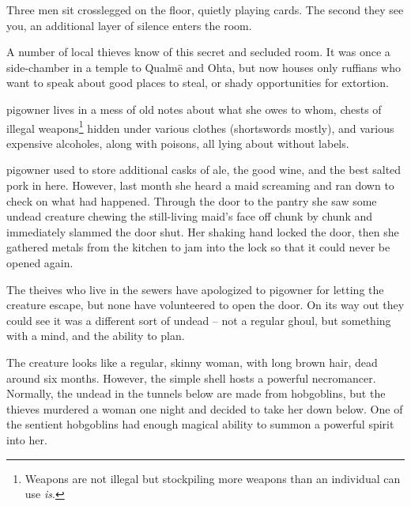 \begin{multicols}{2}

\begin{boxtext}
	Three men sit crosslegged on the floor, quietly playing cards.  The second they see you, an additional layer of silence enters the room.
\end{boxtext}

A number of local thieves know of this secret and secluded room.  It was once a side-chamber in a temple to Qualm\"{e} and Ohta, but now houses only ruffians who want to speak about good places to steal, or shady opportunities for extortion.


\humanthief


\Gls{pigowner} lives in a mess of old notes about what she owes to whom, chests of illegal weapons\footnote{Weapons are not illegal but stockpiling more weapons than an individual can use \emph{is}.} hidden under various clothes (shortswords mostly), and various expensive alcoholes, along with poisons, all lying about without labels.


\Gls{pigowner} used to store additional casks of ale, the good wine, and the best salted pork in here.  However, last month she heard a maid screaming and ran down to check on what had happened.  Through the door to the pantry she saw some undead creature chewing the still-living maid's face off chunk by chunk and immediately slammed the door shut.  Her shaking hand locked the door, then she gathered metals from the kitchen to jam into the lock so that it could never be opened again.

The theives who live in the sewers have apologized to \gls{pigowner} for letting the creature escape, but none have volunteered to open the door.  On its way out they could see it was a different sort of undead -- not a regular ghoul, but something with a mind, and the ability to plan.

The creature looks like a regular, skinny woman, with long brown hair, dead around six months.  However, the simple shell hosts a powerful necromancer.  Normally, the undead in the tunnels below are made from hobgoblins, but the thieves murdered a woman one night and decided to take her down below.  One of the sentient hobgoblins had enough magical ability to summon a powerful spirit into her.

\vfill\null


\end{multicols}
